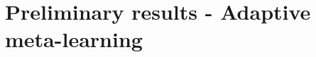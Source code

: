 \documentclass{article}
\theoremstyle{definition}
\newcommand{\Expect}[2]{\mathbb{E}_{#1}\left [#2 \right ]}
\begin{document}
%	
%
%
%
%


\section{Preliminary results - Adaptive meta-learning}
\end{document}
